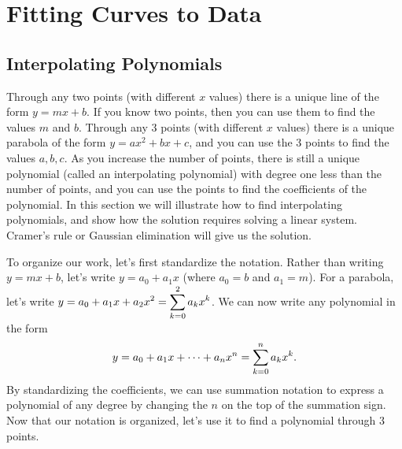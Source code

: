 \section{Fitting Curves to Data}
\subsection{Interpolating Polynomials}
Through any two points (with different $x$ values) there is a unique line of the form $y=mx+b$. If you know two points, then you can use them to find the values $m$ and $b$.  
Through any 3 points (with different $x$ values) there is a unique parabola of the form $y=ax^2+bx+c$, and you can use the 3 points to find the values $a,b,c$.  
As you increase the number of points, there is still a unique polynomial (called an interpolating polynomial) with degree one less than the number of points, and you can use the points to find the coefficients of the polynomial. 
In this section we will illustrate how to find interpolating polynomials, and show how the solution requires solving a linear system. Cramer's rule or Gaussian elimination will give us the solution. 

To organize our work, let's first standardize the notation.  
Rather than writing $y=mx+b$, let's write $y=a_0+a_1 x$ (where $a_0=b$ and $a_1=m$). 
For a parabola, let's write $\displaystyle y=a_0 + a_1 x+ a_2 x^2 = \sum_{k=0}^{2} a_k x^k$. 
We can now write any polynomial in the form 
  $$\displaystyle y = a_0 + a_1 x+ \cdots + a_n x^n = \sum_{k=0}^n a_k x^k.$$ 
By standardizing the coefficients, we can use summation notation to express a polynomial of any degree by changing the $n$ on the top of the summation sign. 
Now that our notation is organized, let's use it to find a polynomial through 3 points.

